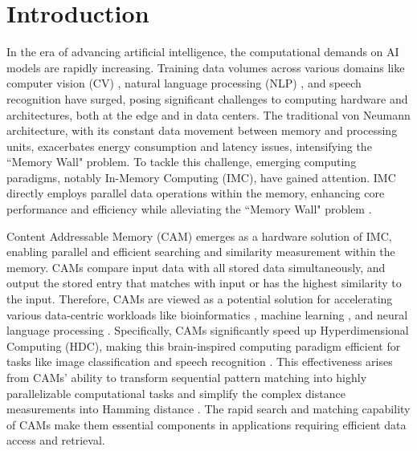 


\section{Introduction}
\label{sec:introduction}

In the era of advancing artificial intelligence, the computational demands on AI models are rapidly increasing. 
Training data volumes across various domains like computer vision (CV) \cite{CV}, natural language processing (NLP) \cite{neural}, and speech recognition \cite{speechrecognition} have surged, posing significant challenges to computing hardware and architectures, both at the edge and in data centers. The traditional von Neumann architecture, with its constant data movement between memory and processing units, exacerbates energy consumption and latency issues, intensifying the ``Memory Wall" problem.
To tackle this challenge, emerging computing paradigms, notably In-Memory Computing (IMC), have gained attention. 
IMC directly employs parallel data operations within the memory, enhancing core performance and efficiency while alleviating the ``Memory Wall" problem \cite{IMC2,  IMC3, yin2024deep, yin2024ferroelectric, yang2024energy, li2024febim}. 

Content Addressable Memory (CAM) emerges as a hardware solution of IMC, enabling parallel and efficient searching and similarity  measurement  within the memory. 
CAMs compare input data with all stored data simultaneously, and output the stored entry that matches with input or has the highest similarity to the input.
Therefore, CAMs are viewed as a potential solution for accelerating 
various data-centric workloads like bioinformatics \cite{zhong2023asmcap,laguna2020seed}, machine learning \cite{2FeFETa, xu2024ferex, hu2021memory}, and neural language processing \cite{neural}.
Specifically, CAMs significantly speed up Hyperdimensional Computing (HDC), making this brain-inspired computing paradigm  efficient for tasks like image classification and speech recognition \cite{HDC1, HDC2, HDC3}. 
This effectiveness arises from CAMs' ability to transform sequential pattern matching into highly parallelizable computational tasks and simplify the complex distance measurements into Hamming distance \cite{kim2020geniehd}. 
The rapid search and matching capability of CAMs make them essential components in applications requiring efficient data access and retrieval.


